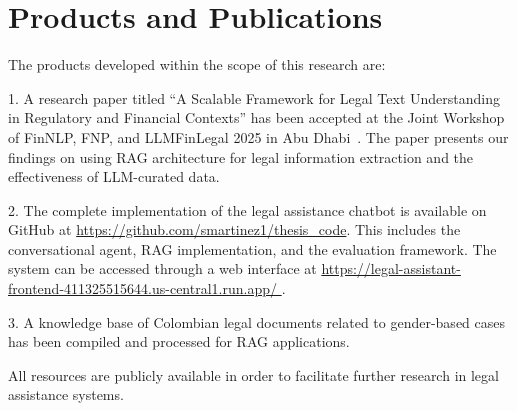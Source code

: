 \section{Products and Publications}
The products developed within the scope of this research are:

1. A research paper titled ``A Scalable Framework for Legal Text Understanding in Regulatory and Financial Contexts'' has been accepted at the Joint Workshop of FinNLP, FNP, and LLMFinLegal 2025 in Abu Dhabi~\cite{martinez-etal-2025-scalable}. 
The paper presents our findings on using RAG architecture for legal information extraction and the effectiveness of LLM-curated data.

2. The complete implementation of the legal assistance chatbot is available on GitHub at 
\url{https://github.com/smartinez1/thesis_code}. This includes the conversational agent, RAG implementation, 
and the evaluation framework. The system can be accessed through a web interface at \url{https://legal-assistant-frontend-411325515644.us-central1.run.app/ }.

3. A knowledge base of Colombian legal documents related to gender-based cases has been compiled and processed for RAG applications.

All resources are publicly available in order to facilitate further research in legal assistance systems.
\endinput